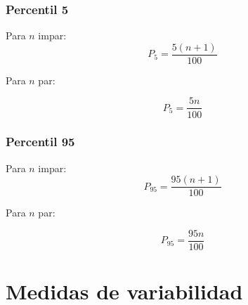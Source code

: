 \documentclass{report}
\begin{document}
          \subsubsection*{Percentil 5}

            \indent Para $n$ impar:
            \begin{equation*}
              P_5=\frac{5(n+1)}{100}
            \end{equation*}

            Para $n$ par:

            \begin{equation*}
              P_5=\frac{5n}{100}
            \end{equation*}

          \subsubsection*{Percentil 95}

            \indent Para $n$ impar:
            \begin{equation*}
              P_95=\frac{95(n+1)}{100}
            \end{equation*}

            Para $n$ par:

            \begin{equation*}
              P_95=\frac{95n}{100}
            \end{equation*}

    \section*{Medidas de variabilidad}
\end{document}
